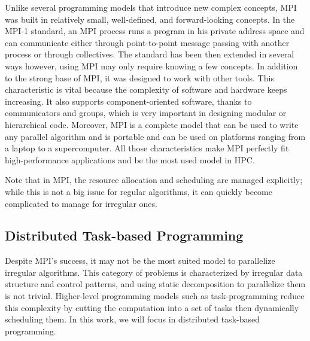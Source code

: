 

Unlike several programming models that introduce new complex concepts, MPI was built in relatively small, well-defined, and forward-looking concepts\cite{traff_recent_2012}. In the MPI-1 standard, an MPI process runs a program in his private address space and can communicate either through point-to-point message passing with another process or through collectives. The standard has been then extended in several ways however, using MPI may only require knowing a few concepts. In addition to the strong base of MPI, it was designed to work with other tools. This characteristic is vital because the complexity of software and hardware keeps increasing. It also supports component-oriented software, thanks to communicators and groups, which is very important in designing modular or hierarchical code. Moreover, MPI is a complete model that can be used to write any parallel algorithm and is portable and can be used on platforms ranging from a laptop to a supercomputer\cite{goos_learning_2001}. All those characteristics make MPI perfectly fit high-performance applications and be the most used model in HPC.

Note that in MPI, the resource allocation and scheduling are managed explicitly; while this is not a big issue for regular algorithms, it can quickly become complicated to manage for irregular ones.

\subsection{Distributed Task-based Programming}

Despite MPI's success, it may not be the most suited model to parallelize irregular algorithms. This category of problems is characterized by irregular data structure and control patterns, and using static decomposition to parallelize them is not trivial. Higher-level programming models such as task-programming reduce this complexity by cutting the computation into a set of tasks then dynamically scheduling them. In this work, we will focus in distributed task-based programming. 

